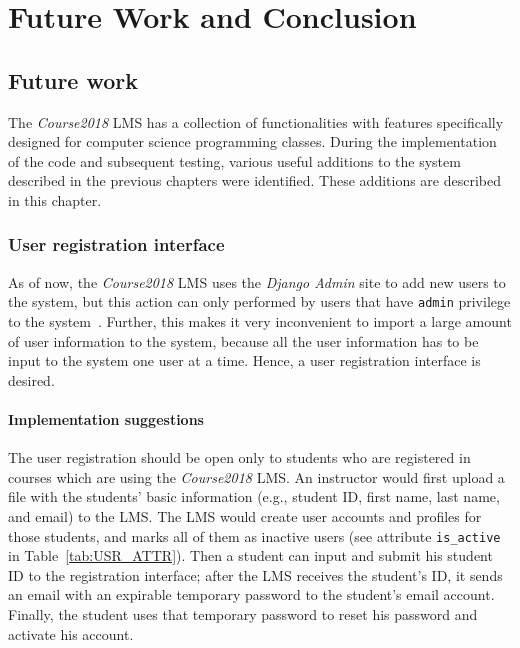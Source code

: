 

\chapter{Future Work and Conclusion}
\label{chap:FUTURE}

\section{Future work}
The \emph{Course2018} LMS has a collection of functionalities 
with features specifically designed for computer science programming
classes.
During the implementation of the code and subsequent testing,
various useful additions to the system
described in the previous chapters were identified.
These additions are described in this chapter.

\subsection{User registration interface}
As of now, the \emph{Course2018} LMS uses the \emph{Django Admin} site to
add new users to the system, but this action can only performed by users that
have \texttt{admin} privilege to the system~\cite{AdjangoAdmin}.
Further, this
makes it very inconvenient to import a large amount of user information to
the system, because all the user information has to be input to the system one
user at a time. Hence, a user registration interface is desired.

\subsubsection{Implementation suggestions}
The user registration should be open only to students
who are registered in courses which are using the \emph{Course2018} LMS\null.
An instructor would first upload a file with the students' basic information
(e.g., student ID, first name, last name, and email) to the LMS\null. The LMS would
create user accounts and profiles for those students, and marks all of them
as inactive users (see attribute \texttt{is\_active} in
Table~\ref{tab:USR_ATTR}).
Then a student can input and submit his student ID to the registration
interface; after the LMS receives the student's ID,
it sends an email with an expirable temporary password to the student's
email account.
Finally, the student uses that temporary password to reset his password and
activate his account.

